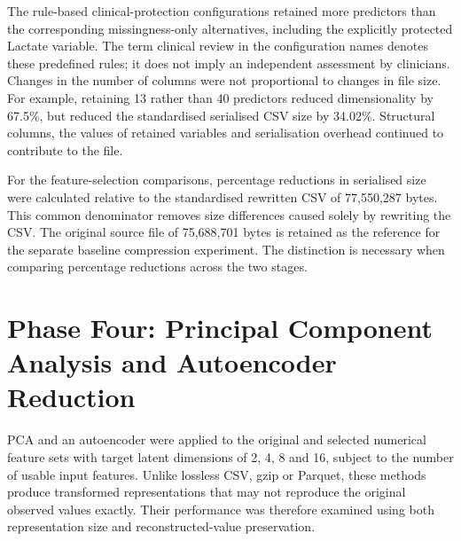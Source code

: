The rule-based clinical-protection configurations retained more
predictors than the corresponding missingness-only alternatives,
including the explicitly protected Lactate variable. The term clinical
review in the configuration names denotes these predefined rules; it
does not imply an independent assessment by clinicians. Changes in the
number of columns were not proportional to changes in file size. For
example, retaining 13 rather than 40 predictors reduced dimensionality
by 67.5\%, but reduced the standardised serialised CSV size by 34.02\%.
Structural columns, the values of retained variables and serialisation
overhead continued to contribute to the file.

For the feature-selection comparisons, percentage reductions in
serialised size were calculated relative to the standardised rewritten
CSV of 77,550,287 bytes. This common denominator removes size
differences caused solely by rewriting the CSV. The original source file
of 75,688,701 bytes is retained as the reference for the separate
baseline compression experiment. The distinction is necessary when
comparing percentage reductions across the two stages.

\section{Phase Four: Principal Component Analysis and Autoencoder
	Reduction}\label{phase-four-principal-component-analysis-and-autoencoder-reduction}

PCA and an autoencoder were applied to the original and selected
numerical feature sets with target latent dimensions of 2, 4, 8 and 16,
subject to the number of usable input features. Unlike lossless CSV,
gzip or Parquet, these methods produce transformed representations that
may not reproduce the original observed values exactly. Their
performance was therefore examined using both representation size and
reconstructed-value preservation.

